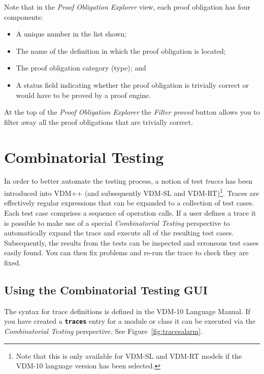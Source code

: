\documentclass{overturerepchap}
\begin{document}
Note that in the \emph{Proof Obligation Explorer} view, each proof
obligation has four components:
\begin{itemize}
\item A unique number in the list shown;
\item The name of the definition in which the proof obligation is
  located;
\item The proof obligation category (type); and
\item A status field indicating whether the proof obligation is
  trivially correct or would have to be proved by a proof engine.
\end{itemize}

At the top of the \emph{Proof Obligation Explorer} the \emph{Filter proved} button
allows you to filter away all the proof obligations that are trivially
correct.

\chapter{Combinatorial Testing}\label{sec:testing}

In order to better automate the testing process, a notion of
test \emph{traces} has been introduced into VDM++ (and subsequently VDM-SL and VDM-RT)\footnote{Note that this is
only available for VDM-SL and VDM-RT models if the VDM-10 language version has been selected.}.
Traces are effectively regular expressions that can be expanded to a collection of test
cases. Each test case comprises a sequence of operation
calls. If a user defines a trace it is possible to make use of a
special \emph{Combinatorial Testing} perspective to automatically
expand the trace and execute all of the resulting test
cases. Subsequently, the results from the tests can be inspected
and erroneous test cases easily found. You can then fix
problems and re-run the trace to check they are fixed.

\section{Using the Combinatorial Testing GUI}

The syntax for trace definitions is defined in the VDM-10 Language
Manual.
If you have created a {\textbf\texttt{traces}} entry for a module or class it
can be executed via the \emph{Combinatorial Testing}
perspective. See
Figure~\ref{fig:tracesalarm}.
\end{document}
